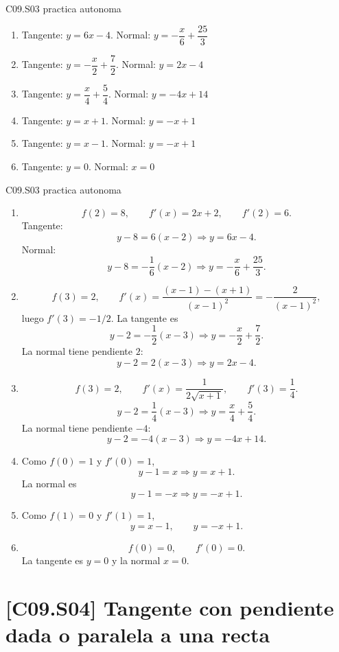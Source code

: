 \begin{shortanswer}{C09.S03 practica autonoma}
\begin{enumerate}[label=\textbf{PX-C09.S03-\arabic*:}, leftmargin=*]
  \item Tangente: \(y=6x-4\). Normal: \(y=-\dfrac{x}{6}+\dfrac{25}{3}\)
  \item Tangente: \(y=-\dfrac{x}{2}+\dfrac{7}{2}\). Normal: \(y=2x-4\)
  \item Tangente: \(y=\dfrac{x}{4}+\dfrac{5}{4}\). Normal: \(y=-4x+14\)
  \item Tangente: \(y=x+1\). Normal: \(y=-x+1\)
  \item Tangente: \(y=x-1\). Normal: \(y=-x+1\)
  \item Tangente: \(y=0\). Normal: \(x=0\)
\end{enumerate}
\end{shortanswer}

\begin{fullsolution}{C09.S03 practica autonoma}
\begin{enumerate}[label=\textbf{PX-C09.S03-\arabic*:}, leftmargin=*]
  \item
  \[
  f(2)=8,\qquad f'(x)=2x+2,\qquad f'(2)=6.
  \]
  Tangente:
  \[
  y-8=6(x-2)\Longrightarrow y=6x-4.
  \]
  Normal:
  \[
  y-8=-\frac{1}{6}(x-2)\Longrightarrow y=-\frac{x}{6}+\frac{25}{3}.
  \]
  \item
  \[
  f(3)=2,\qquad f'(x)=\frac{(x-1)-(x+1)}{(x-1)^2}=-\frac{2}{(x-1)^2},
  \]
  luego \(f'(3)=-1/2\). La tangente es
  \[
  y-2=-\frac{1}{2}(x-3)\Longrightarrow y=-\frac{x}{2}+\frac{7}{2}.
  \]
  La normal tiene pendiente \(2\):
  \[
  y-2=2(x-3)\Longrightarrow y=2x-4.
  \]
  \item
  \[
  f(3)=2,\qquad f'(x)=\frac{1}{2\sqrt{x+1}},\qquad f'(3)=\frac{1}{4}.
  \]
  \[
  y-2=\frac{1}{4}(x-3)\Longrightarrow y=\frac{x}{4}+\frac{5}{4}.
  \]
  La normal tiene pendiente \(-4\):
  \[
  y-2=-4(x-3)\Longrightarrow y=-4x+14.
  \]
  \item Como \(f(0)=1\) y \(f'(0)=1\),
  \[
  y-1=x\Longrightarrow y=x+1.
  \]
  La normal es
  \[
  y-1=-x\Longrightarrow y=-x+1.
  \]
  \item Como \(f(1)=0\) y \(f'(1)=1\),
  \[
  y=x-1,\qquad y=-x+1.
  \]
  \item
  \[
  f(0)=0,\qquad f'(0)=0.
  \]
  La tangente es \(y=0\) y la normal \(x=0\).
\end{enumerate}
\end{fullsolution}

\section{[C09.S04] Tangente con pendiente dada o paralela a una recta}

